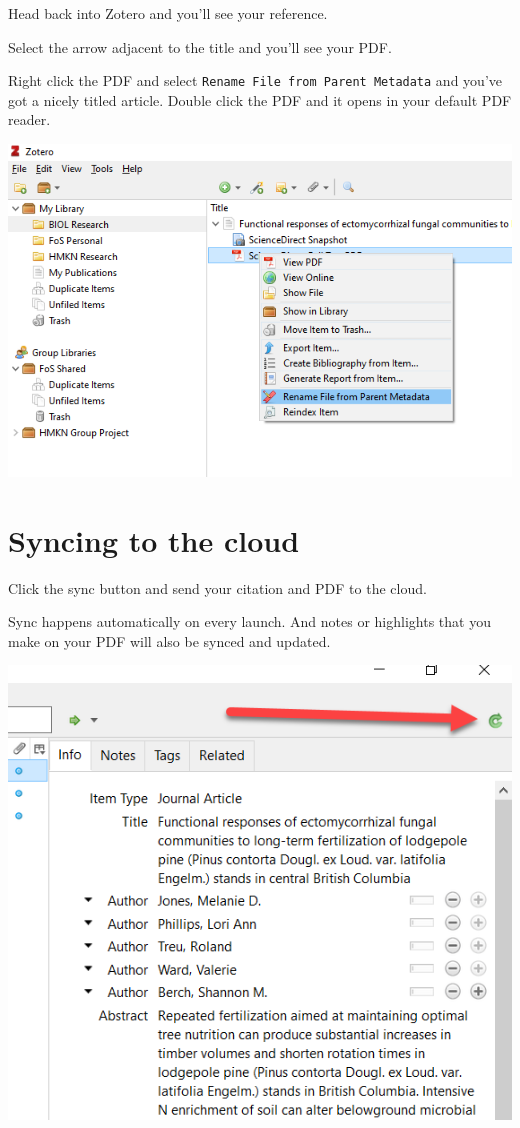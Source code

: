 \documentclass[
]{book}
\begin{document}
Head back into Zotero and you'll see your reference.

Select the arrow adjacent to the title and you'll see your PDF.

Right click the PDF and select \texttt{Rename\ File\ from\ Parent\ Metadata} and you've got a nicely titled article. Double click the PDF and it opens in your default PDF reader.

\includegraphics{images/Z_PDFRename.png}

\hypertarget{syncing-to-the-cloud}{%
\section{Syncing to the cloud}\label{syncing-to-the-cloud}}

Click the sync button and send your citation and PDF to the cloud.

Sync happens automatically on every launch. And notes or highlights that you make on your PDF will also be synced and updated.

\includegraphics{images/Z_PDFSync.png}
\end{document}
